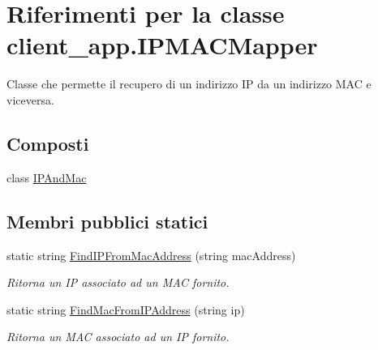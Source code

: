 \hypertarget{classclient__app_1_1_i_p_m_a_c_mapper}{}\section{Riferimenti per la classe client\+\_\+app.\+I\+P\+M\+A\+C\+Mapper}
\label{classclient__app_1_1_i_p_m_a_c_mapper}


Classe che permette il recupero di un indirizzo IP da un indirizzo M\+AC e viceversa.  


\subsection*{Composti}
\begin{DoxyCompactItemize}
\item 
class \mbox{\hyperlink{classclient__app_1_1_i_p_m_a_c_mapper_1_1_i_p_and_mac}{I\+P\+And\+Mac}}
\end{DoxyCompactItemize}
\subsection*{Membri pubblici statici}
\begin{DoxyCompactItemize}
\item 
static string \mbox{\hyperlink{classclient__app_1_1_i_p_m_a_c_mapper_a1d99b364932535f9d9daac81708f8d6f}{Find\+I\+P\+From\+Mac\+Address}} (string mac\+Address)
\begin{DoxyCompactList}\small\item\em Ritorna un IP associato ad un M\+AC fornito. \end{DoxyCompactList}\item 
static string \mbox{\hyperlink{classclient__app_1_1_i_p_m_a_c_mapper_a65f5f001eb7378e284a4646e37b77658}{Find\+Mac\+From\+I\+P\+Address}} (string ip)
\begin{DoxyCompactList}\small\item\em Ritorna un M\+AC associato ad un IP fornito. \end{DoxyCompactList}\end{DoxyCompactItemize}
